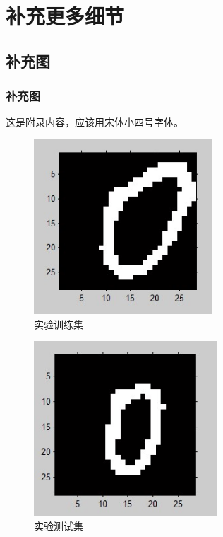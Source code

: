 \chapter{补充更多细节}

\section{补充图}

\subsection{补充图}

这是附录内容，应该用宋体小四号字体。
\begin{figure}[htbp]
        \centering
        \includegraphics[height=6.54cm]{image/chap04/1.jpg}
        \caption{实验训练集}
\end{figure}
\begin{figure}
        \centering
        \includegraphics[height=6.54cm]{image/chap04/2.jpg}
        \caption{实验测试集}
\end{figure}

\endinput
